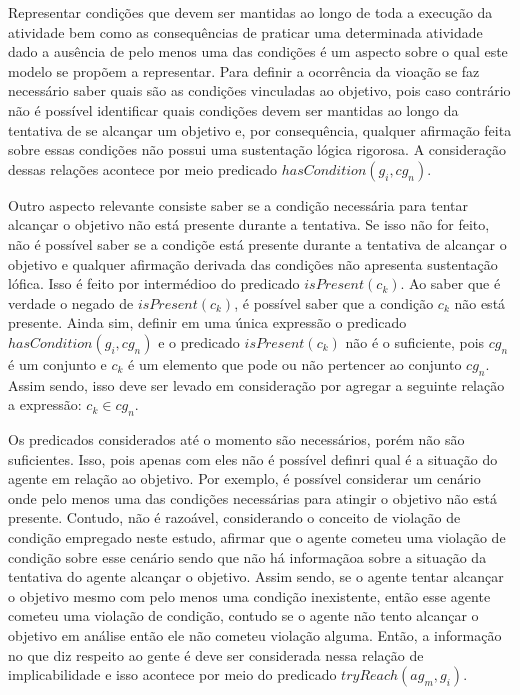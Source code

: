 \documentclass[12pt]{article}
\begin{document}
Representar condições que devem ser mantidas ao longo de toda a execução da atividade bem como as consequências de praticar uma determinada atividade dado a ausência de pelo menos uma das condições é um aspecto sobre o qual este modelo se propõem a representar. Para definir a ocorrência da vioação se faz necessário saber quais são as condições vinculadas ao objetivo, pois caso contrário não é possível identificar quais condições devem ser mantidas ao longo da tentativa de se alcançar um objetivo e, por consequência, qualquer afirmação feita sobre essas condições não possui uma sustentação lógica rigorosa. A consideração dessas relações acontece por meio predicado $hasCondition(g_i,cg_n)$. 

Outro aspecto relevante consiste saber se a condição necessária para tentar alcançar o objetivo não está presente durante a tentativa. Se isso não for feito, não é possível saber se a condiçõe está presente durante a tentativa de alcançar o objetivo e qualquer afirmação derivada das condições não apresenta sustentação lófica. Isso é feito por intermédioo do predicado $isPresent(c_k)$. Ao saber que é verdade o negado de $isPresent(c_k)$, é possível saber que a condição $c_k$ não está presente. Ainda sim, definir em uma única expressão o predicado $hasCondition(g_i,cg_n)$ e o predicado $isPresent(c_k)$ não é o suficiente, pois $cg_n$ é um conjunto e $c_k$ é um elemento que pode ou não pertencer ao conjunto $cg_n$. Assim sendo, isso deve ser levado em consideração por agregar a seguinte relação a expressão: $c_k \in cg_n$. 

Os predicados considerados até o momento são necessários, porém não são suficientes. Isso, pois apenas com eles não é possível definri qual é a situação do agente em relação ao objetivo. Por exemplo, é possível considerar um cenário onde pelo menos uma das condições necessárias para atingir o objetivo não está presente. Contudo, não é razoável, considerando o conceito de violação de condição empregado neste estudo, afirmar que o agente cometeu uma violação de condição sobre esse cenário sendo que não há informaçãoa sobre a situação da tentativa do agente alcançar o objetivo. Assim sendo, se o agente tentar alcançar o objetivo mesmo com pelo menos uma condição inexistente, então esse agente cometeu uma violação de condição, contudo se o agente não tento alcançar o objetivo em análise então ele não cometeu violação alguma. Então, a informação no que diz respeito ao gente é deve ser considerada nessa relação de implicabilidade e isso acontece por meio do predicado $tryReach(ag_m,g_i)$.
\end{document}
